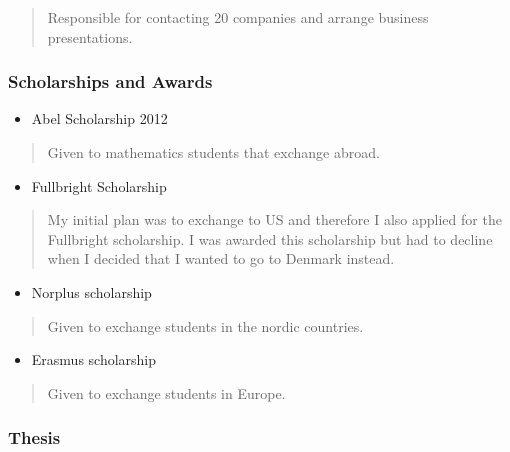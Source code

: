\documentclass[11pt, a4paper]{article}
\providecommand{\tightlist}{%
  \setlength{\itemsep}{0pt}\setlength{\parskip}{0pt}}
\begin{document}
\begin{raggedright}
\begin{quote}
Responsible for contacting 20 companies and arrange business
presentations.
\end{quote}

\hypertarget{scholarships-and-awards}{%
\subsubsection{Scholarships and Awards}\label{scholarships-and-awards}}

\begin{itemize}
\tightlist
\item
  Abel Scholarship 2012
\end{itemize}

\begin{quote}
Given to mathematics students that exchange abroad.
\end{quote}

\begin{itemize}
\tightlist
\item
  Fullbright Scholarship
\end{itemize}

\begin{quote}
My initial plan was to exchange to US and therefore I also applied for
the Fullbright scholarship. I was awarded this scholarship but had to
decline when I decided that I wanted to go to Denmark instead.
\end{quote}

\begin{itemize}
\tightlist
\item
  Norplus scholarship
\end{itemize}

\begin{quote}
Given to exchange students in the nordic countries.
\end{quote}

\begin{itemize}
\tightlist
\item
  Erasmus scholarship
\end{itemize}

\begin{quote}
Given to exchange students in Europe.
\end{quote}

\hypertarget{thesis}{%
\subsubsection{Thesis}\label{thesis}}


\end{raggedright}
\end{document}
